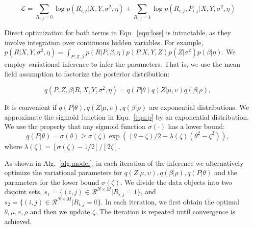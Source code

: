 \documentclass[sigconf,anonymous]{acmart}
\begin{document}
\begin{equation}\label{equ:loss}
\mathcal{L}=\sum_{R_{i,j}=0} \log p(R_{i,j}|X,Y,\sigma^2,\eta) + \sum_{R_{i,j}=1} \log p(R_{i,j},P_{i,j}|X,Y,\sigma^2,\eta)
\end{equation}


Direct optimization for both terms in Equ.~\ref{equ:loss} is intractable, as they involve integration over continuous hidden variables. For example, $p(R|X,Y,\sigma^2,\eta)=\int_{P,Z,\beta} p(R|P,\beta,\eta) p(P|X,Y,Z) p(Z|\sigma^2) p(\beta|\eta) $. We employ variational inference to infer the parameters. That is, we use the mean field assumption to factorize the posterior distribution: 

\begin{equation}
    q(P,Z,\beta|R,X,Y,\sigma^{2},\eta) = q(P|\theta)q(Z|\mu,\upsilon)q(\beta|\rho),
\end{equation}

It is convenient if $q(P|\theta),q(Z|\mu,\upsilon),q(\beta|\rho)$ are exponential distributions. We approximate the sigmoid function in Equ.~\ref{equ:p} by an exponential distribution. We use the property that any sigmoid function $\sigma(\cdot)$ has a lower bound:
\begin{equation}
q(P|\theta)=\sigma(\theta)\geq \sigma(\zeta)\exp{((\theta-\zeta)/2-\lambda(\zeta)(\theta^2-\zeta^2))},
\end{equation}
where $\lambda(\zeta)=[\sigma(\zeta)-1/2]/[2\zeta]$.

As shown in Alg.~\ref{alg:model}, in each iteration of the inference we alternatively optimize the variational parameters for $q(Z|\mu,\upsilon),q(\beta|\rho), q(P|\theta)$ and the parameters for the lower bound $\sigma(\zeta)$. We divide the data objects into two disjoint sets, $s_1 = \{(i,j)\in \mathcal{R}^{N\times M}|R_{i,j}=1\}$, and $s_2= \{(i,j)\in \mathcal{R}^{N\times M}|R_{i,j}=0\}$. In each iteration, we first obtain the optimal $\theta,\mu,v,\rho$ and then we update $\zeta$. The iteration is repeated until convergence is achieved.
\end{document}
